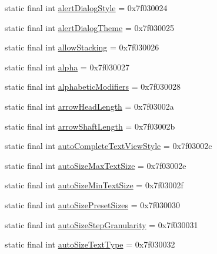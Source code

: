 \begin{DoxyCompactItemize}
\item 
static final int \mbox{\hyperlink{classandroid_1_1support_1_1design_1_1_r_1_1attr_a243018b6844b3078db89b7739f73fc13}{alert\+Dialog\+Style}} = 0x7f030024
\item 
static final int \mbox{\hyperlink{classandroid_1_1support_1_1design_1_1_r_1_1attr_a544216476a21a3edafffc422db18bf9f}{alert\+Dialog\+Theme}} = 0x7f030025
\item 
static final int \mbox{\hyperlink{classandroid_1_1support_1_1design_1_1_r_1_1attr_a7765cc0f9b1bd3b722ad66fe69e34ced}{allow\+Stacking}} = 0x7f030026
\item 
static final int \mbox{\hyperlink{classandroid_1_1support_1_1design_1_1_r_1_1attr_a4cb2639e62dfbced7fb3335e94681ba0}{alpha}} = 0x7f030027
\item 
static final int \mbox{\hyperlink{classandroid_1_1support_1_1design_1_1_r_1_1attr_a0ca32622f7143f20147727db88acb2ec}{alphabetic\+Modifiers}} = 0x7f030028
\item 
static final int \mbox{\hyperlink{classandroid_1_1support_1_1design_1_1_r_1_1attr_a1c5413c1d098f1dedeec52bf1f60bbd4}{arrow\+Head\+Length}} = 0x7f03002a
\item 
static final int \mbox{\hyperlink{classandroid_1_1support_1_1design_1_1_r_1_1attr_a5173098b8b4a2a042d1dc65c0726feb4}{arrow\+Shaft\+Length}} = 0x7f03002b
\item 
static final int \mbox{\hyperlink{classandroid_1_1support_1_1design_1_1_r_1_1attr_a7b3906d45193c214e16185415dde30b0}{auto\+Complete\+Text\+View\+Style}} = 0x7f03002c
\item 
static final int \mbox{\hyperlink{classandroid_1_1support_1_1design_1_1_r_1_1attr_a592b4d4333dd68b09348090b3b33c518}{auto\+Size\+Max\+Text\+Size}} = 0x7f03002e
\item 
static final int \mbox{\hyperlink{classandroid_1_1support_1_1design_1_1_r_1_1attr_ac5176518a95620dc64f13b219fce66f1}{auto\+Size\+Min\+Text\+Size}} = 0x7f03002f
\item 
static final int \mbox{\hyperlink{classandroid_1_1support_1_1design_1_1_r_1_1attr_a642cd88b82964b4ef57642f6d72f99cf}{auto\+Size\+Preset\+Sizes}} = 0x7f030030
\item 
static final int \mbox{\hyperlink{classandroid_1_1support_1_1design_1_1_r_1_1attr_ad7439f128e025029578dbe3e80250846}{auto\+Size\+Step\+Granularity}} = 0x7f030031
\item 
static final int \mbox{\hyperlink{classandroid_1_1support_1_1design_1_1_r_1_1attr_a7bb4c8381e9cfab8b4dc317a93106688}{auto\+Size\+Text\+Type}} = 0x7f030032

\end{DoxyCompactItemize}
